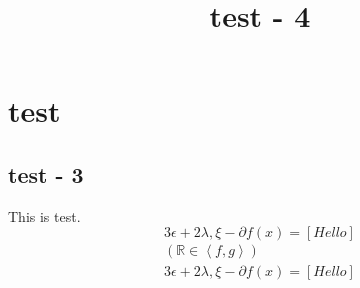 \documentclass[11pt,reqno]{amsart}
\theoremstyle{definition}
\theoremstyle{remark}
\numberwithin{equation}{section}
\renewcommand{\(}{\left(}
\renewcommand{\)}{\right)}
\begin{document}
\title[] {test - 4} \maketitle \section{test} \subsection{test - 3} This is test. \begin{equation} 3 \epsilon + 2 {\lambda, \xi} - \partial f(x) = \left[ Hello \right] \end{equation} \begin{align} \( \mathbb{R} \in \left< f, g \right> \) \\ 3 \epsilon + 2 {\lambda, \xi} - \partial f(x) = \left[ Hello \right] \end{align}
\end{document}
